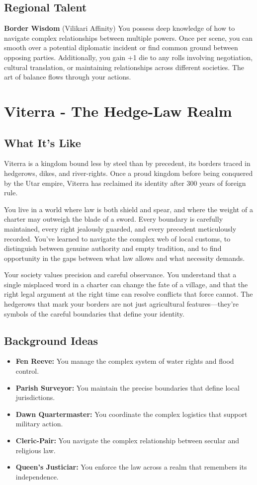 \documentclass[11pt]{article}
\newcommand{\region}[1]{\section*{#1}}
\newcommand{\subregion}[1]{\subsection*{#1}}
\begin{document}
\begin{multicols}{2}
\subregion{Regional Talent}

\textbf{Border Wisdom} (Vilikari Affinity)
You possess deep knowledge of how to navigate complex relationships between multiple powers. Once per scene, you can smooth over a potential diplomatic incident or find common ground between opposing parties. Additionally, you gain +1 die to any rolls involving negotiation, cultural translation, or maintaining relationships across different societies. The art of balance flows through your actions.

\end{multicols}

\region{Viterra - The Hedge-Law Realm}

\begin{multicols}{2}
\subregion{What It's Like}

Viterra is a kingdom bound less by steel than by precedent, its borders traced in hedgerows, dikes, and river-rights. Once a proud kingdom before being conquered by the Utar empire, Viterra has reclaimed its identity after 300 years of foreign rule.

You live in a world where law is both shield and spear, and where the weight of a charter may outweigh the blade of a sword. Every boundary is carefully maintained, every right jealously guarded, and every precedent meticulously recorded. You've learned to navigate the complex web of local customs, to distinguish between genuine authority and empty tradition, and to find opportunity in the gaps between what law allows and what necessity demands.

Your society values precision and careful observance. You understand that a single misplaced word in a charter can change the fate of a village, and that the right legal argument at the right time can resolve conflicts that force cannot. The hedgerows that mark your borders are not just agricultural features—they're symbols of the careful boundaries that define your identity.

\columnbreak

\subregion{Background Ideas}

\begin{itemize}[leftmargin=*]
    \item \textbf{Fen Reeve:} You manage the complex system of water rights and flood control.
    \item \textbf{Parish Surveyor:} You maintain the precise boundaries that define local jurisdictions.
    \item \textbf{Dawn Quartermaster:} You coordinate the complex logistics that support military action.
    \item \textbf{Cleric-Pair:} You navigate the complex relationship between secular and religious law.
    \item \textbf{Queen's Justiciar:} You enforce the law across a realm that remembers its independence.
\end{itemize}


\end{multicols}
\end{document}
